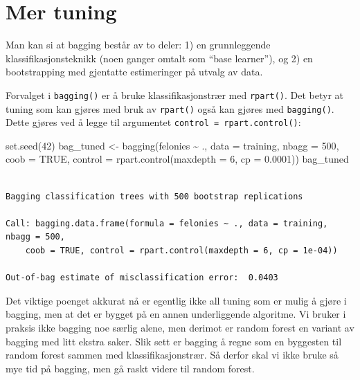 \documentclass[
  letterpaper,
  DIV=11,
  numbers=noendperiod]{scrreprt}
\newenvironment{Shaded}{\begin{snugshade}}{\end{snugshade}}
\newcommand{\AttributeTok}[1]{\textcolor[rgb]{0.40,0.45,0.13}{#1}}
\newcommand{\ConstantTok}[1]{\textcolor[rgb]{0.56,0.35,0.01}{#1}}
\newcommand{\DecValTok}[1]{\textcolor[rgb]{0.68,0.00,0.00}{#1}}
\newcommand{\FloatTok}[1]{\textcolor[rgb]{0.68,0.00,0.00}{#1}}
\newcommand{\FunctionTok}[1]{\textcolor[rgb]{0.28,0.35,0.67}{#1}}
\newcommand{\NormalTok}[1]{\textcolor[rgb]{0.00,0.23,0.31}{#1}}
\newcommand{\OtherTok}[1]{\textcolor[rgb]{0.00,0.23,0.31}{#1}}
\newcommand{\SpecialCharTok}[1]{\textcolor[rgb]{0.37,0.37,0.37}{#1}}
\begin{document}
\section{Mer tuning}\label{mer-tuning}

Man kan si at bagging består av to deler: 1) en grunnleggende
klassifikasjonsteknikk (noen ganger omtalt som ``base learner''), og 2)
en bootstrapping med gjentatte estimeringer på utvalg av data.

Forvalget i \texttt{bagging()} er å bruke klassifikasjonstrær med
\texttt{rpart()}. Det betyr at tuning som kan gjøres med bruk av
\texttt{rpart()} også kan gjøres med \texttt{bagging()}. Dette gjøres
ved å legge til argumentet \texttt{control\ =\ rpart.control()}:

\begin{Shaded}
\begin{Highlighting}[]
\FunctionTok{set.seed}\NormalTok{(}\DecValTok{42}\NormalTok{)}
\NormalTok{bag\_tuned }\OtherTok{\textless{}{-}} \FunctionTok{bagging}\NormalTok{(felonies }\SpecialCharTok{\textasciitilde{}}\NormalTok{ ., }\AttributeTok{data =}\NormalTok{ training,}
                     \AttributeTok{nbagg =} \DecValTok{500}\NormalTok{, }\AttributeTok{coob =} \ConstantTok{TRUE}\NormalTok{,}
                     \AttributeTok{control =} \FunctionTok{rpart.control}\NormalTok{(}\AttributeTok{maxdepth =} \DecValTok{6}\NormalTok{, }\AttributeTok{cp =} \FloatTok{0.0001}\NormalTok{))}
\NormalTok{bag\_tuned}
\end{Highlighting}
\end{Shaded}

\begin{verbatim}

Bagging classification trees with 500 bootstrap replications 

Call: bagging.data.frame(formula = felonies ~ ., data = training, nbagg = 500, 
    coob = TRUE, control = rpart.control(maxdepth = 6, cp = 1e-04))

Out-of-bag estimate of misclassification error:  0.0403 
\end{verbatim}

Det viktige poenget akkurat nå er egentlig ikke all tuning som er mulig
å gjøre i bagging, men at det er bygget på en annen underliggende
algoritme. Vi bruker i praksis ikke bagging noe særlig alene, men
derimot er random forest en variant av bagging med litt ekstra saker.
Slik sett er bagging å regne som en byggesten til random forest sammen
med klassifikasjonstrær. Så derfor skal vi ikke bruke så mye tid på
bagging, men gå raskt videre til random forest.
\end{document}
